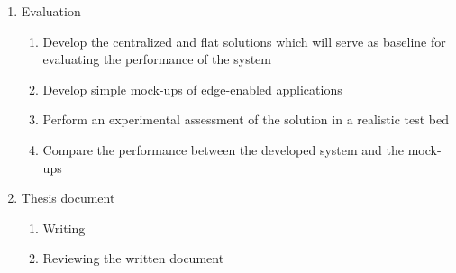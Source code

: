 \begin{enumerate}
    \item Evaluation
    
    \begin{enumerate}
        \item Develop the centralized and flat solutions which will serve as baseline for evaluating the performance of the system
        \item Develop simple mock-ups of edge-enabled applications
        \item Perform an experimental assessment of the solution in a realistic test bed
        \item Compare the performance between the developed system and the mock-ups
    \end{enumerate}

    \item Thesis document
    
    \begin{enumerate}
        \item Writing
        \item Reviewing the written document
    \end{enumerate}
    
\end{enumerate}
